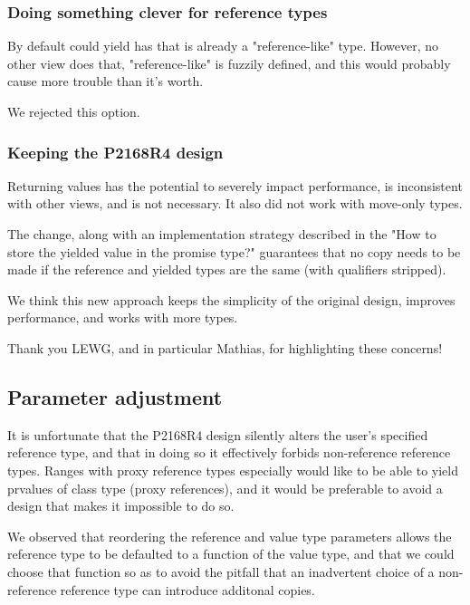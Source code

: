 \documentclass{wg21}
\begin{document}
\subsubsection{Doing something clever for reference types}

By default  could yield  has that is already a "reference-like" type.
However, no other view does that, "reference-like" is fuzzily defined, and this would probably cause more trouble than it's worth.

We rejected this option.

\subsubsection{Keeping the P2168R4 design}

Returning values has the potential to severely impact performance, is inconsistent with other views, and is not necessary.
It also did not work with move-only types.

The change, along with an implementation strategy described in the "How to store the yielded value in the promise type?" guarantees that
no copy needs to be made if the reference and yielded types are the same (with qualifiers stripped).

We think this new approach keeps the simplicity of the original design, improves performance, and works with more types.

Thank you LEWG, and in particular Mathias, for highlighting these concerns!

\subsection{Parameter adjustment}

It is unfortunate that the P2168R4 design silently alters
the user's specified reference type,
and that in doing so it effectively forbids non-reference reference types.
Ranges with proxy reference types especially would like
to be able to yield prvalues of class type (proxy references), and
it would be preferable to avoid a design that makes it impossible to do so.

We observed that reordering the reference and value type parameters
allows the reference type to be defaulted to a function of the value type,
and that we could choose that function so as to avoid the pitfall that
an inadvertent choice of a non-reference reference type
can introduce additonal copies.
\end{document}
